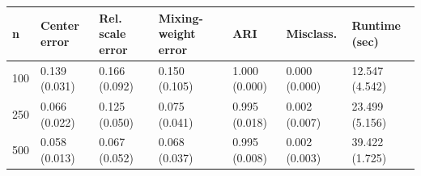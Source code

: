 \begin{tabular}{lllllll}
\hline
n & Center error & Rel. scale error & Mixing-weight error & ARI & Misclass. & Runtime (sec) \\
\hline
100 & 0.139 (0.031) & 0.166 (0.092) & 0.150 (0.105) & 1.000 (0.000) & 0.000 (0.000) & 12.547 (4.542) \\
250 & 0.066 (0.022) & 0.125 (0.050) & 0.075 (0.041) & 0.995 (0.018) & 0.002 (0.007) & 23.499 (5.156) \\
500 & 0.058 (0.013) & 0.067 (0.052) & 0.068 (0.037) & 0.995 (0.008) & 0.002 (0.003) & 39.422 (1.725) \\
\hline
\end{tabular}
